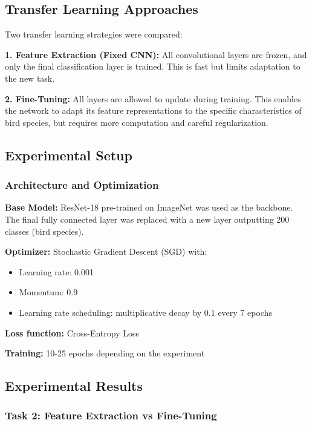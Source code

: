 \documentclass[conference]{IEEEtran}
\begin{document}
\subsection{Transfer Learning Approaches}

Two transfer learning strategies were compared:

\textbf{1. Feature Extraction (Fixed CNN):} All convolutional layers are frozen, and only the final classification layer is trained. This is fast but limits adaptation to the new task.

\textbf{2. Fine-Tuning:} All layers are allowed to update during training. This enables the network to adapt its feature representations to the specific characteristics of bird species, but requires more computation and careful regularization.

\subsection{Experimental Setup}

\subsubsection{Architecture and Optimization}

\textbf{Base Model:} ResNet-18 pre-trained on ImageNet was used as the backbone. The final fully connected layer was replaced with a new layer outputting 200 classes (bird species).

\textbf{Optimizer:} Stochastic Gradient Descent (SGD) with:
\begin{itemize}
\item Learning rate: 0.001
\item Momentum: 0.9
\item Learning rate scheduling: multiplicative decay by 0.1 every 7 epochs
\end{itemize}

\textbf{Loss function:} Cross-Entropy Loss

\textbf{Training:} 10-25 epochs depending on the experiment

\subsection{Experimental Results}

\subsubsection{Task 2: Feature Extraction vs Fine-Tuning}
\end{document}
